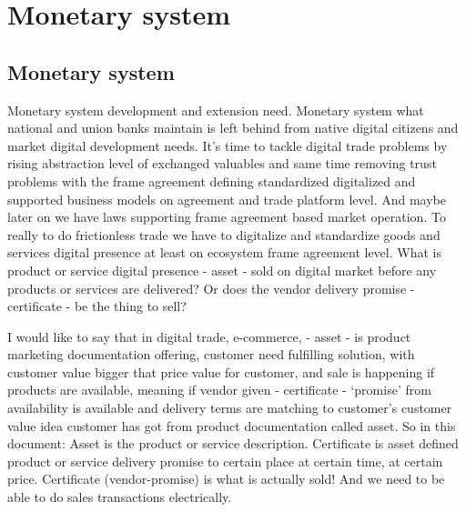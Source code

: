 %
%
%
\part{Monetary system}
\chapter{Monetary system}\label{monetary_system}
Monetary system development and extension need. Monetary system what national
and union banks maintain is left behind from native digital citizens and
market digital development needs. It's time to tackle digital trade problems
by rising abstraction level of exchanged valuables and same time removing
trust problems with the frame agreement defining standardized digitalized and
supported business models on agreement and trade platform level. And maybe
later on we have laws supporting frame agreement based market operation. To
really to do frictionless trade we have to digitalize and standardize goods
and services digital presence at least on ecosystem frame agreement level.
What is product or service digital presence - asset - sold on digital market
before any products or services are delivered? Or does the vendor delivery
promise - certificate - be the thing to sell?

I would like to say that in digital trade, e-commerce, - asset - is product
marketing documentation offering, customer need fulfilling solution, with
customer value bigger that price value for customer, and sale is happening if
products are available, meaning if vendor given - certificate - `promise' from
availabi\-li\-ty is available and delivery terms are matching to customer's
customer value idea customer has got from product documentation called asset.
So in this document: Asset is the product or service description. Certificate
is asset defined product or service delivery promise to certain place at
certain time, at certain price. Certificate (vendor-promise) is what is
actually sold! And we need to be able to do sales transactions electrically.

